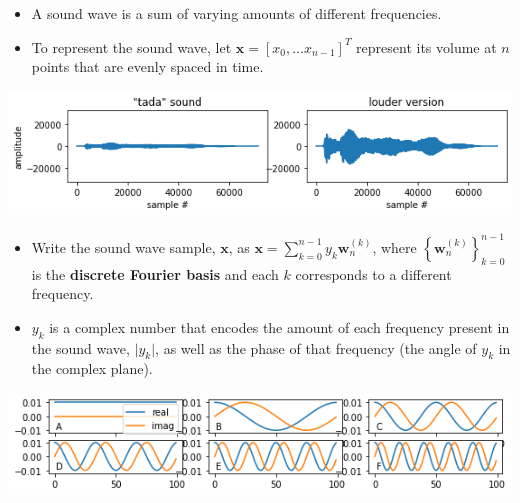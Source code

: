 \documentclass[12pt,letterpaper,noanswers]{exam}
\newcommand{\vc}[1]{\boldsymbol{#1}}
\begin{document}
\begin{tcolorbox}
\begin{itemize}
\itemsep0pt
    \item A sound wave is a sum of varying amounts of different frequencies.
    \item To represent the sound wave, let $\vc{x} = [x_0,...x_{n-1}]^T$ represent its volume at $n$ points that are evenly spaced in time.
\end{itemize}
\end{tcolorbox}
\hspace{-0.2in}\includegraphics[width=0.7\linewidth]{img/C20tada.png}


\begin{tcolorbox}
\begin{itemize}
\itemsep0pt
    \item Write the sound wave sample, $\vc{x}$, as $\vc{x} = \sum\limits_{k=0}^{n-1}y_k \vc{w}_n^{(k)}$, where $\left\{\vc{w}_n^{(k)}\right\}_{k=0}^{n-1}$ is the \textbf{discrete Fourier basis} and each $k$ corresponds to a different frequency.
    \item $y_k$ is a complex number that encodes the amount of each frequency present in the sound wave, $\vert y_k\vert$, as well as the phase of that frequency (the angle of $y_k$ in the complex plane).
\end{itemize}



\end{tcolorbox}

\hspace{-0.1in}\includegraphics[width=\textwidth]{img/C20modes.png}
\end{document}

